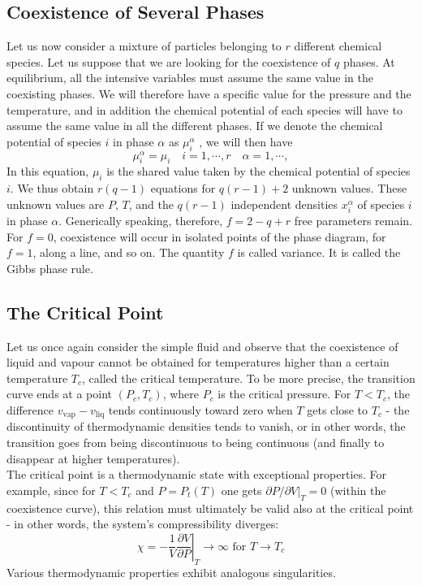\documentclass[cyan]{elegantnote}
\begin{document}
\subsection{Coexistence of Several Phases}
Let us now consider a mixture of particles belonging to $r$ different chemical species. Let us suppose that we are looking for the coexistence of $q$ phases. At equilibrium, all the intensive variables must assume the same value in the coexisting phases. We will therefore have a specific value for the pressure and the temperature, and in addition the chemical potential of each species will have to assume the same value in all the different phases. If we denote the chemical potential of species $i$ in phase $\alpha$ as $\mu_i^{\alpha}$ , we will then have
\[\mu_{i}^{\alpha} = \mu_i \quad i = 1,\cdots,r \quad \alpha = 1,\cdots,\]
In this equation, $\mu_i$ is the shared value taken by the chemical potential of species $i$. We
thus obtain $r(q-1)$ equations for $q(r-1)+2$ unknown values. These unknown values are $P$, $T$, and the $q(r-1)$ independent densities $x_i^{\alpha}$ of species $i$ in phase $\alpha$. Generically speaking, therefore, $f = 2 - q + r$ free parameters remain. For $f = 0$, coexistence will occur in isolated points of the phase diagram, for $f = 1$, along a line, and so on. The quantity $f$ is called variance.  It is called the Gibbs phase rule.

\subsection{The Critical Point}
Let us once again consider the simple fluid and observe that the coexistence of liquid and vapour cannot be obtained for temperatures higher than a certain temperature $T_c$, called the critical temperature. To be more precise, the transition curve ends at a point $(P_c,T_c)$, where $P_c$ is the critical pressure. For $T < T_c$, the difference $v_{\mathrm{vap}}-v_{\mathrm{liq}}$ tends continuously toward zero when $T$ gets close to $T_c$ - the discontinuity of thermodynamic densities tends to vanish, or in other words, the transition goes from being discontinuous to being continuous (and finally to disappear at higher temperatures).
\\
The critical point is a thermodynamic state with exceptional properties. For example, since for $T < T_c$ and $P = P_t(T)$ one gets $\partial P / \partial V |_{T} = 0$ (within the coexistence curve), this relation must ultimately be valid also at the critical point - in other words, the system's compressibility diverges:
\[\chi = - \frac{1}{V} \left. \frac{\partial V}{\partial P} \right|_{T} \to \infty \mbox{ for } T \to T_c \]
Various thermodynamic properties exhibit analogous singularities.
\end{document}
